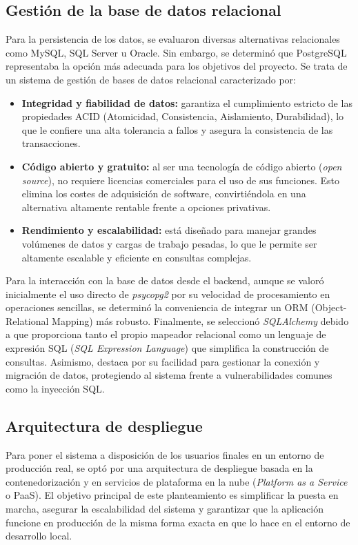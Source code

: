 \documentclass[12pt,a4paper,oneside]{report}
\begin{document}
\subsection*{Gestión de la base de datos relacional}

Para la persistencia de los datos, se evaluaron diversas alternativas relacionales como MySQL, SQL Server u Oracle. Sin embargo, se determinó que PostgreSQL representaba la opción más adecuada para los objetivos del proyecto. Se trata de un sistema de gestión de bases de datos relacional caracterizado por:
\begin{itemize}
    \item \textbf{Integridad y fiabilidad de datos:} garantiza el cumplimiento estricto de las propiedades ACID (Atomicidad, Consistencia, Aislamiento, Durabilidad), lo que le confiere una alta tolerancia a fallos y asegura la consistencia de las transacciones.
    \item \textbf{Código abierto y gratuito:} al ser una tecnología de código abierto (\textit{open source}), no requiere licencias comerciales para el uso de sus funciones. Esto elimina los costes de adquisición de software, convirtiéndola en una alternativa altamente rentable frente a opciones privativas.
    \item \textbf{Rendimiento y escalabilidad:} está diseñado para manejar grandes volúmenes de datos y cargas de trabajo pesadas, lo que le permite ser altamente escalable y eficiente en consultas complejas.
\end{itemize}

Para la interacción con la base de datos desde el backend, aunque se valoró inicialmente el uso directo de \textit{psycopg2} por su velocidad de procesamiento en operaciones sencillas, se determinó la conveniencia de integrar un ORM (Object-Relational Mapping) más robusto. Finalmente, se seleccionó \textit{SQLAlchemy} debido a que proporciona tanto el propio mapeador relacional como un lenguaje de expresión SQL (\textit{SQL Expression Language}) que simplifica la construcción de consultas. Asimismo, destaca por su facilidad para gestionar la conexión y migración de datos, protegiendo al sistema frente a vulnerabilidades comunes como la inyección SQL.

\subsection*{Arquitectura de despliegue}

Para poner el sistema a disposición de los usuarios finales en un entorno de producción real, se optó por una arquitectura de despliegue basada en la contenedorización y en servicios de plataforma en la nube (\textit{Platform as a Service} o PaaS). El objetivo principal de este planteamiento es simplificar la puesta en marcha, asegurar la escalabilidad del sistema y garantizar que la aplicación funcione en producción de la misma forma exacta en que lo hace en el entorno de desarrollo local.
\end{document}
